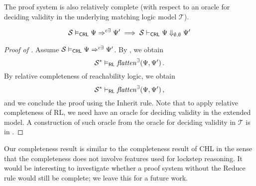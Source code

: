 


The proof system is also relatively complete (with respect to an oracle for deciding validity
in the underlying matching logic model $\mathcal{T}$).
\begin{theorem}\label{thm:relativeCompleteness}
  \begin{equation*}
      \mathcal{S} \vDash_{\mathsf{CRL}} \Psi \Rightarrow^{c\exists} \Psi^\prime \implies
      \mathcal{S} \vdash_{\mathsf{CRL}} \Psi \Downarrow_{\emptyset,\emptyset} \Psi^\prime
  \end{equation*}
  \end{theorem}
  \begin{proof}[Proof of ]
  Assume $\mathcal{S} \vDash_{\mathsf{CRL}} \Psi \Rightarrow^{c\exists} \Psi^\prime$.
  By , 
  we obtain
  \begin{equation*}
   \mathcal{S}^* \vDash_{\mathsf{RL}}
    \mathit{flatten}^\exists(\Psi, \Psi^\prime) \, .
  \end{equation*}
  By relative completeness of reachability logic, we obtain
  \begin{equation*}
    \mathcal{S}^* \vdash_{\mathsf{RL}}
    \mathit{flatten}^\exists(\Psi, \Psi^\prime) \, ,
  \end{equation*}
  and we conclude the proof using the Inherit rule.
  Note that to apply relative completeness of RL, we need have an oracle for deciding validity in the extended model.
  A construction of such oracle from the oracle for deciding validity in $\mathcal{T}$ is in .
  \end{proof}
Our completeness result is similar to the completeness result of CHL in the sense that the completeness
does not involve features used for lockstep reasoning.
It would be interesting to investigate whether a proof system without the Reduce rule would still be complete;
we leave this for a future work.

